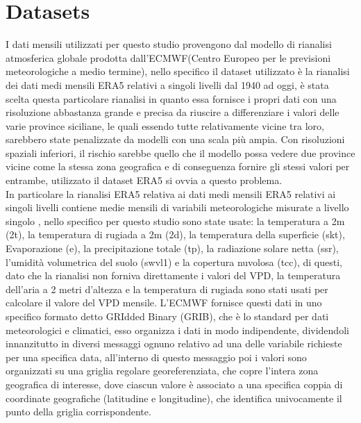 \section{Datasets}
I dati mensili utilizzati per questo studio provengono dal modello di rianalisi atmosferica globale prodotta dall'ECMWF(Centro Europeo per le previsioni meteorologiche a medio termine), nello specifico il dataset utilizzato è la rianalisi dei dati medi mensili ERA5 relativi a singoli livelli dal 1940 ad oggi, è stata scelta questa particolare rianalisi in quanto essa fornisce i propri dati con una risoluzione abbastanza grande e precisa da riuscire a differenziare i valori delle varie province siciliane, le quali essendo tutte relativamente vicine tra loro, sarebbero state penalizzate da modelli con una scala più ampia. Con risoluzioni spaziali inferiori, il rischio sarebbe quello che il modello possa vedere due province vicine come la stessa zona geografica e di conseguenza fornire gli stessi valori per entrambe, utilizzato il dataset ERA5 si ovvia a questo problema.\\
In particolare la rianalisi ERA5 relativa ai dati medi mensili ERA5 relativi ai singoli livelli contiene medie mensili di variabili meteorologiche misurate a livello singolo , nello specifico per questo studio sono state usate: la temperatura a 2m (2t), la temperatura di rugiada a 2m (2d), la temperatura della superficie (skt), Evaporazione (e), la precipitazione totale (tp), la radiazione solare netta (ssr), l'umidità volumetrica del suolo (swvl1) e la copertura nuvolosa (tcc), di questi, dato che la rianalisi non forniva direttamente i valori del VPD, la temperatura dell'aria a 2 metri d'altezza e la temperatura di rugiada sono stati usati per calcolare il valore del VPD mensile.
L'ECMWF fornisce questi dati in uno specifico formato detto GRIdded Binary (GRIB), che è lo standard per dati meteorologici e climatici, esso organizza i dati in modo indipendente, dividendoli innanzitutto in diversi messaggi ognuno relativo ad una delle variabile richieste per una specifica data, all'interno di questo messaggio poi i valori sono organizzati su una griglia regolare georeferenziata, che copre l'intera zona geografica di interesse, dove ciascun valore è associato a una specifica coppia di coordinate geografiche (latitudine e longitudine), che identifica univocamente il punto della griglia corrispondente.\\

